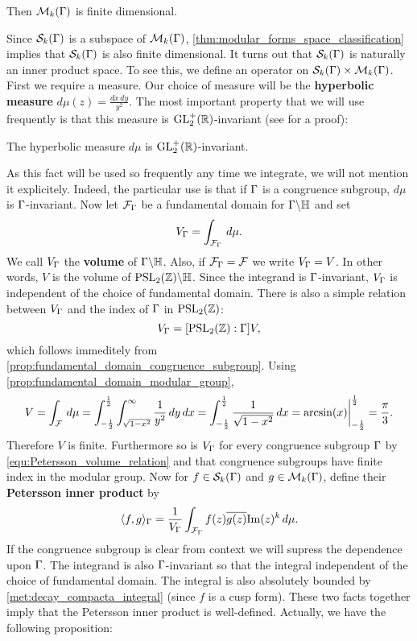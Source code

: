       \begin{theorem}\label{thm:modular_forms_space_classification}
        Then $\mathcal{M}_{k}(\Gamma)$ is finite dimensional.
      \end{theorem}

      Since $\mathcal{S}_{k}(\Gamma)$ is a subspace of $\mathcal{M}_{k}(\Gamma)$, \cref{thm:modular_forms_space_classification} implies that $\mathcal{S}_{k}(\Gamma)$ is also finite dimensional. It turns out that $\mathcal{S}_{k}(\Gamma)$ is naturally an inner product space. To see this, we define an operator on $\mathcal{S}_{k}(\Gamma) \times \mathcal{M}_{k}(\Gamma)$. First we require a measure. Our choice of measure will be the \textbf{hyperbolic measure} $d\mu(z) = \frac{dx\,dy}{y^{2}}$. The most important property that we will use frequently is that this measure is $\mathrm{GL}_{2}^{+}(\mathbb{R})$-invariant (see \cite{diamond2005first} for a proof):

      \begin{proposition}
        The hyperbolic measure $d\mu$ is $\mathrm{GL}_{2}^{+}(\mathbb{R})$-invariant.
      \end{proposition}

      As this fact will be used so frequently any time we integrate, we will not mention it explicitely. Indeed, the particular use is that if $\Gamma$ is a congruence subgroup, $d\mu$ is $\Gamma$-invariant. Now let $\mathcal{F}_{\Gamma}$ be a fundamental domain for $\Gamma\backslash\mathbb{H}$ and set
      \[
        V_{\Gamma} = \int_{\mathcal{F}_{\Gamma}}\,d\mu.
      \]
      We call $V_{\Gamma}$ the \textbf{volume} of $\Gamma\backslash\mathbb{H}$. Also, if $\mathcal{F}_{\Gamma} = \mathcal{F}$ we write $V_{\Gamma} = V$. In other words, $V$ is the volume of $\mathrm{PSL}_{2}(\mathbb{Z})\backslash\mathbb{H}$. Since the integrand is $\Gamma$-invariant, $V_{\Gamma}$ is independent of the choice of fundamental domain. There is also a simple relation between $V_{\Gamma}$ and the index of $\Gamma$ in $\mathrm{PSL}_{2}(\mathbb{Z})$:
      \begin{equation}\label{equ:Petersson_volume_relation}
        V_{\Gamma} = [\mathrm{PSL}_{2}(\mathbb{Z}):\Gamma]V,
      \end{equation}
      which follows immeditely from \cref{prop:fundamental_domain_congruence_subgroup}. Using \cref{prop:fundamental_domain_modular_group},
      \[
        V = \int_{\mathcal{F}}\,d\mu = \int_{-\frac{1}{2}}^{\frac{1}{2}}\int_{\sqrt{1-x^{2}}}^{\infty}\frac{1}{y^{2}}\,dy\,dx = \int_{-\frac{1}{2}}^{\frac{1}{2}}\frac{1}{\sqrt{1-x^{2}}}\,dx = \arcsin(x)\bigg|_{-\frac{1}{2}}^{\frac{1}{2}} = \frac{\pi}{3}.
      \]
      Therefore $V$ is finite. Furthermore so is $V_{\Gamma}$ for every congruence subgroup $\Gamma$ by \cref{equ:Petersson_volume_relation} and that congruence subgroups have finite index in the modular group. Now for $f \in \mathcal{S}_{k}(\Gamma)$ and $g \in \mathcal{M}_{k}(\Gamma)$, define their \textbf{Petersson inner product} by
      \[
        \langle f,g\rangle_{\Gamma} = \frac{1}{V_{\Gamma}}\int_{\mathcal{F}_{\Gamma}}f(z)\overline{g(z)}\mathrm{Im}(z)^{k}\,d\mu.
      \]
      If the congruence subgroup is clear from context we will supress the dependence upon $\Gamma$. The integrand is also $\Gamma$-invariant so that the integral independent of the choice of fundamental domain. The integral is also absolutely bounded by \cref{met:decay_compacta_integral} (since $f$ is a cusp form). These two facts together imply that the Petersson inner product is well-defined. Actually, we have the following proposition:

